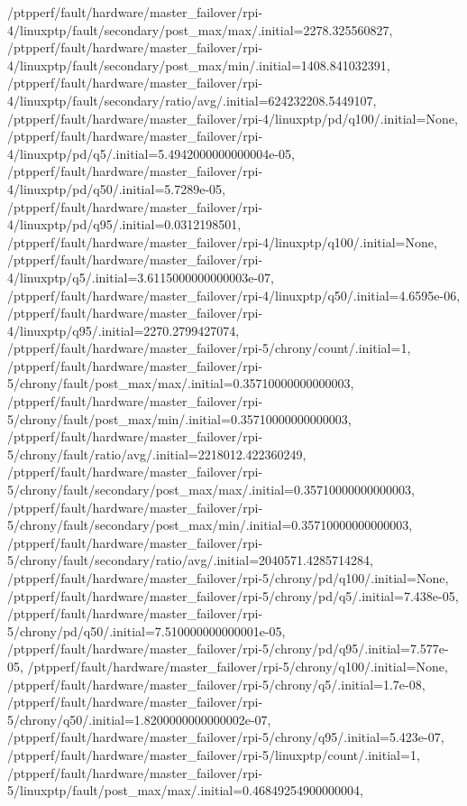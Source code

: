 {    /ptpperf/fault/hardware/master_failover/rpi-4/linuxptp/fault/secondary/post_max/max/.initial=2278.325560827,
    /ptpperf/fault/hardware/master_failover/rpi-4/linuxptp/fault/secondary/post_max/min/.initial=1408.841032391,
    /ptpperf/fault/hardware/master_failover/rpi-4/linuxptp/fault/secondary/ratio/avg/.initial=624232208.5449107,
    /ptpperf/fault/hardware/master_failover/rpi-4/linuxptp/pd/q100/.initial=None,
    /ptpperf/fault/hardware/master_failover/rpi-4/linuxptp/pd/q5/.initial=5.4942000000000004e-05,
    /ptpperf/fault/hardware/master_failover/rpi-4/linuxptp/pd/q50/.initial=5.7289e-05,
    /ptpperf/fault/hardware/master_failover/rpi-4/linuxptp/pd/q95/.initial=0.0312198501,
    /ptpperf/fault/hardware/master_failover/rpi-4/linuxptp/q100/.initial=None,
    /ptpperf/fault/hardware/master_failover/rpi-4/linuxptp/q5/.initial=3.6115000000000003e-07,
    /ptpperf/fault/hardware/master_failover/rpi-4/linuxptp/q50/.initial=4.6595e-06,
    /ptpperf/fault/hardware/master_failover/rpi-4/linuxptp/q95/.initial=2270.2799427074,
    /ptpperf/fault/hardware/master_failover/rpi-5/chrony/count/.initial=1,
    /ptpperf/fault/hardware/master_failover/rpi-5/chrony/fault/post_max/max/.initial=0.35710000000000003,
    /ptpperf/fault/hardware/master_failover/rpi-5/chrony/fault/post_max/min/.initial=0.35710000000000003,
    /ptpperf/fault/hardware/master_failover/rpi-5/chrony/fault/ratio/avg/.initial=2218012.422360249,
    /ptpperf/fault/hardware/master_failover/rpi-5/chrony/fault/secondary/post_max/max/.initial=0.35710000000000003,
    /ptpperf/fault/hardware/master_failover/rpi-5/chrony/fault/secondary/post_max/min/.initial=0.35710000000000003,
    /ptpperf/fault/hardware/master_failover/rpi-5/chrony/fault/secondary/ratio/avg/.initial=2040571.4285714284,
    /ptpperf/fault/hardware/master_failover/rpi-5/chrony/pd/q100/.initial=None,
    /ptpperf/fault/hardware/master_failover/rpi-5/chrony/pd/q5/.initial=7.438e-05,
    /ptpperf/fault/hardware/master_failover/rpi-5/chrony/pd/q50/.initial=7.510000000000001e-05,
    /ptpperf/fault/hardware/master_failover/rpi-5/chrony/pd/q95/.initial=7.577e-05,
    /ptpperf/fault/hardware/master_failover/rpi-5/chrony/q100/.initial=None,
    /ptpperf/fault/hardware/master_failover/rpi-5/chrony/q5/.initial=1.7e-08,
    /ptpperf/fault/hardware/master_failover/rpi-5/chrony/q50/.initial=1.8200000000000002e-07,
    /ptpperf/fault/hardware/master_failover/rpi-5/chrony/q95/.initial=5.423e-07,
    /ptpperf/fault/hardware/master_failover/rpi-5/linuxptp/count/.initial=1,
    /ptpperf/fault/hardware/master_failover/rpi-5/linuxptp/fault/post_max/max/.initial=0.46849254900000004,
}
